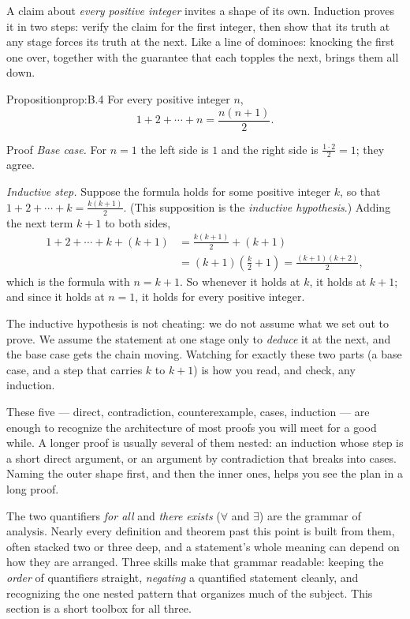 \documentclass[a4paper,12pt,oneside]{memoir}
\begin{document}
 A claim about \emph{every positive integer} invites a shape of its own. Induction proves it in two steps: verify the claim for the first integer, then show that its truth at any stage forces its truth at the next. Like a line of dominoes: knocking the first one over, together with the guarantee that each topples the next, brings them all down.

\begin{envproposition}{Proposition}{prop:B.4}{}
For every positive integer \(n\), \[ 1 + 2 + \cdots + n = \frac{n(n + 1)}{2}. \]
\end{envproposition}
\begin{envproof}{Proof}{}{}
\emph{Base case.} For \(n = 1\) the left side is \(1\) and the right side is \(\frac{1 \cdot 2}{2} = 1\); they agree.

\emph{Inductive step.} Suppose the formula holds for some positive integer \(k\), so that \(1 + 2 + \cdots + k = \frac{k(k + 1)}{2}\). (This supposition is the \emph{inductive hypothesis}.) Adding the next term \(k + 1\) to both sides, \[ \begin{aligned} 1 + 2 + \cdots + k + (k + 1) &= \frac{k(k + 1)}{2} + (k + 1) \\ &= (k + 1)\!\left(\frac{k}{2} + 1\right) = \frac{(k + 1)(k + 2)}{2}, \end{aligned} \] which is the formula with \(n = k + 1\). So whenever it holds at \(k\), it holds at \(k + 1\); and since it holds at \(n = 1\), it holds for every positive integer. \qedmark
\end{envproof}
The inductive hypothesis is not cheating: we do not assume what we set out to prove. We assume the statement at one stage only to \emph{deduce} it at the next, and the base case gets the chain moving. Watching for exactly these two parts (a base case, and a step that carries \(k\) to \(k + 1\)) is how you read, and check, any induction.

These five — direct, contradiction, counterexample, cases, induction — are enough to recognize the architecture of most proofs you will meet for a good while. A longer proof is usually several of them nested: an induction whose step is a short direct argument, or an argument by contradiction that breaks into cases. Naming the outer shape first, and then the inner ones, helps you see the plan in a long proof.


The two quantifiers \emph{for all} and \emph{there exists} (\(\forall\) and \(\exists\)) are the grammar of analysis. Nearly every definition and theorem past this point is built from them, often stacked two or three deep, and a statement’s whole meaning can depend on how they are arranged. Three skills make that grammar readable: keeping the \emph{order} of quantifiers straight, \emph{negating} a quantified statement cleanly, and recognizing the one nested pattern that organizes much of the subject. This section is a short toolbox for all three.
\end{document}
